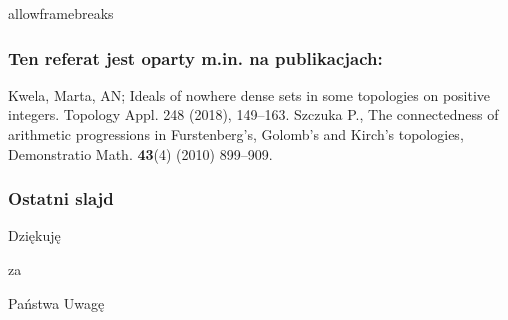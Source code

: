 \documentclass{beamer}
\begin{document}
\begin{frame}[label=bibliografia]{allowframebreaks}
\frametitle{Ten referat jest oparty m.in. na publikacjach:}
\beamertemplatebookbibitems
\begin{thebibliography}{10}{
 {\sc Kwela, Marta, AN;} {Ideals of nowhere dense sets in some topologies on positive integers.} Topology Appl. 248 (2018), 149–163.
}
{\sc Szczuka P.}, {The connectedness of arithmetic progressions in Furstenberg's, Golomb's and Kirch's topologies},
Demonstratio Math. {\bf 43}(4) (2010) 899--909.

\hyperlink{powrot}{}

\end{thebibliography}
\end{frame}

\begin{frame}\frametitle{Ostatni slajd}
\begin{center}{\Huge Dziękuję}\end{center}
\begin{center}{\Huge za}\end{center}
\begin{center}{\Huge Państwa Uwagę}\end{center}
\end{frame}
\end{document}
